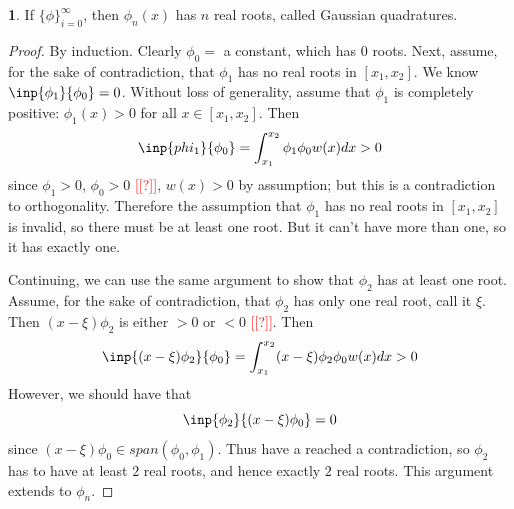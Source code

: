 \documentclass[12pt]{article}
\theoremstyle{definition}
\newtheorem{theorem}{\color{ForestGreen}{\textbf{Theorem}}}
\theoremstyle{definition}
\begin{document}
\begin{theorem}
	If $\{\phi\}_{i=0}^\infty$, then $\phi_n(x)$ has $n$ real roots, called Gaussian quadratures. 
\end{theorem}
\begin{proof}
	By induction. Clearly $\phi_0 =$ a constant, which has $0$ roots. Next, assume, for the sake of contradiction, that $\phi_1$ has no real roots in $[x_1,x_2]$. We know $\inp{\phi_1}{\phi_0} = 0$. Without loss of generality, assume that $\phi_1$ is completely positive: $\phi_1(x) > 0$ for all $x \in [x_1,x_2]$. Then
	\begin{equation}
		\inp{phi_1}{\phi_0} = \int_{x_1}^{x_2} \phi_1 \phi_0 w(x) dx > 0
	\end{equation}
	since $\phi_1 > 0$, $\phi_0 > 0$ \textcolor{red}{[[?]]}, $w(x) > 0$ by assumption; but this is a contradiction to orthogonality. Therefore the assumption that $\phi_1$ has no real roots in $[x_1,x_2]$ is invalid, so there must be at least one root. But it can't have more than one, so it has exactly one. 

	Continuing, we can use the same argument to show that $\phi_2$ has at least one root. Assume, for the sake of contradiction, that $\phi_2$ has only one real root, call it $\xi$. Then $(x-\xi)\phi_2$ is either $> 0$ or $< 0$ \textcolor{red}{[[?]]}. Then 
	\begin{equation}
		\inp{(x-\xi)\phi_2}{\phi_0} = \int_{x_1}^{x_2} (x-\xi)\phi_2 \phi_0 w(x) dx > 0
	\end{equation}
	However, we should have that 
	\begin{equation}
		\inp{\phi_2}{(x-\xi)\phi_0} = 0
	\end{equation}
	since $(x-\xi)\phi_0 \in span(\phi_0,\phi_1)$. Thus have a reached a contradiction, so $\phi_2$ has to have at least $2$ real roots, and hence exactly $2$ real roots. This argument extends to $\phi_n$.
\end{proof}
\end{document}
